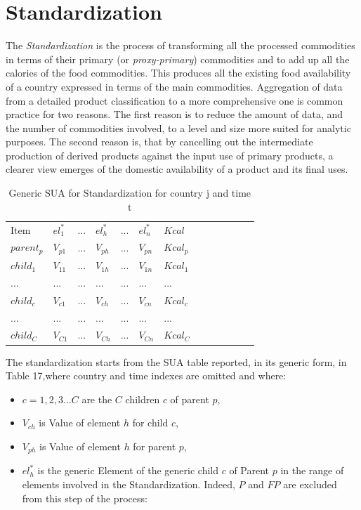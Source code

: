 \documentclass[]{article}
\providecommand{\tightlist}{%
  \setlength{\itemsep}{0pt}\setlength{\parskip}{0pt}}
\begin{document}
\section{Standardization}\label{standardization}

The \emph{Standardization} is the process of transforming all the
processed commodities in terms of their primary (or
\emph{proxy-primary}) commodities and to add up all the calories of the
food commodities. This produces all the existing food availability of a
country expressed in terms of the main commodities. Aggregation of data
from a detailed product classification to a more comprehensive one is
common practice for two reasons. The first reason is to reduce the
amount of data, and the number of commodities involved, to a level and
size more suited for analytic purposes. The second reason is, that by
cancelling out the intermediate production of derived products against
the input use of primary products, a clearer view emerges of the
domestic availability of a product and its final uses.

\begin {table}[H]
\begin{center}
\caption {Generic SUA for Standardization for country j and time t}

\begin{tabular}{lllllllllllll}
& & & & & \\
 \hline
Item & $el^{*}_{1}$ & ... & $el^{*}_{h}$ & ...& $el^{*}_{n}$ & $Kcal$\\ 
 \hline
$parent_{p}$ & $V_{p1}$ & ...& $V_{ph}$ & ...& $V_{pn}$ & $Kcal_{p}$\\ 
$child_{1}$ & $V_{11}$ & ... & $V_{1h}$ & ...& $V_{1n}$ & $Kcal_{1}$\\ 
... & ... & ... & ... & ... & ... & ... & \\ 
$child_{c}$ & $V_{c1}$ & ... & $V_{ch}$ & ...& $V_{cn}$ & $Kcal_{c}$\\ 
... & ... & ... & ... & ... & ... & ... & \\ 
$child_{C}$ & $V_{C1}$ & ... & $V_{Ch}$ & ...& $V_{Cn}$ & $Kcal_{C}$\\ 
 \hline
\end{tabular}
\end{center}
\end {table}

The standardization starts from the SUA table reported, in its generic
form, in Table 17,where country and time indexes are omitted and where:

\begin{itemize}
\tightlist
\item
  \(c = 1,2,3...C\) are the \(C\) children \(c\) of parent \(p\),
\item
  \(V_{ch}\) is Value of element \(h\) for child \(c\),
\item
  \(V_{ph}\) is Value of element \(h\) for parent \(p\),
\item
  \(el^{*}_{h}\) is the generic Element of the generic child \(c\) of
  Parent \(p\) in the range of elements involved in the Standardization.
  Indeed, \(P\) and \(FP\) are excluded from this step of the process:
\end{itemize}
\end{document}
